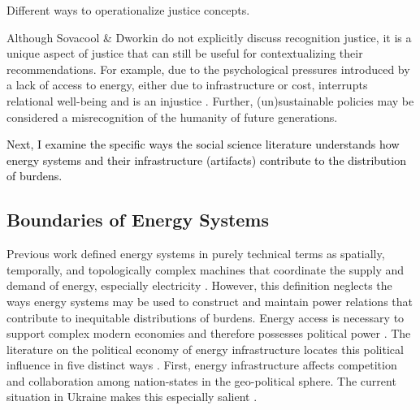 \begin{table}[h]
    \centering
    \caption{Different ways to operationalize justice concepts.}
    
    \label{tab:justice-frameworks}
\end{table}

Although Sovacool \& Dworkin do not explicitly discuss recognition justice, it
is a unique aspect of justice that can still be useful for contextualizing their
recommendations. For example, due to the psychological pressures introduced by a
lack of access to energy, either due to infrastructure or cost, interrupts
relational well-being and is an injustice \cite{van_uffelen_revisiting_2022}.
Further, (un)sustainable policies may be considered a misrecognition of the
humanity of future generations.

\textcolor{black}{Next, I examine the specific ways the social science literature understands how energy systems and their infrastructure (artifacts) contribute to the distribution of burdens.}

\subsection{Boundaries of Energy Systems}

Previous work defined energy systems in purely technical terms as spatially,
temporally, and topologically complex machines that coordinate the supply and
demand of energy, especially electricity \cite{dotson_influence_2022}. However,
this definition neglects the ways energy systems may be used to construct and
maintain power relations that contribute to inequitable distributions of
burdens. Energy access is necessary to support complex modern economies and
therefore possesses political power \cite{jones_building_2013,
bridge_energy_2018}. The literature on the political economy of energy
infrastructure locates this political influence in five distinct ways
\cite{bridge_energy_2018}. First, energy infrastructure affects competition and
collaboration among nation-states in the geo-political sphere. The current
situation in Ukraine makes this especially salient
\cite{figueiredo_impacts_2022}. 

